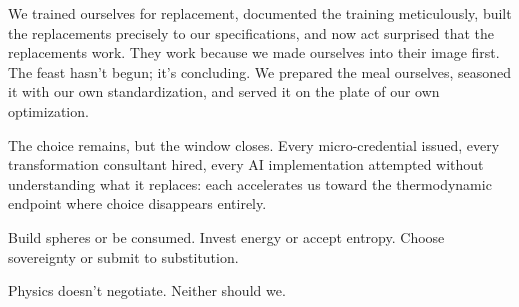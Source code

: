 We trained ourselves for replacement, documented the training meticulously, built the replacements precisely to our specifications, and now act surprised that the replacements work. They work because we made ourselves into their image first. The feast hasn't begun; it's concluding. We prepared the meal ourselves, seasoned it with our own standardization, and served it on the plate of our own optimization.

The choice remains, but the window closes. Every micro-credential issued, every transformation consultant hired, every AI implementation attempted without understanding what it replaces: each accelerates us toward the thermodynamic endpoint where choice disappears entirely.

Build spheres or be consumed. Invest energy or accept entropy. Choose sovereignty or submit to substitution.

Physics doesn't negotiate. Neither should we.
